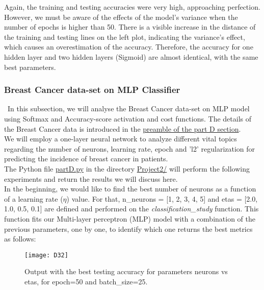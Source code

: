 Again, the training and testing accuracies were very high, approaching perfection. However, we must be aware of the effects of the model's variance when the number of epochs is higher than 50. There is a visible increase in the distance of the training and testing lines on the left plot, indicating the variance's effect, which causes an overestimation of the accuracy. Therefore, the accuracy for one hidden layer and two hidden layers (Sigmoid) are almost identical, with the same best parameters.

\subsubsection{Breast Cancer data-set on MLP Classifier}
\label{chap:Breast Cancer data-set on MLP Classifier}

\quad \, In this subsection, we will analyse the Breast Cancer data-set on MLP model using Softmax and Accuracy-score activation and cost functions. The details of the Breast Cancer data is introduced in the \hyperref[chap:Part D]{preamble of the part D section}.\\

We will employ a one-layer neural network to analyze different vital topics regarding the number of neurons, learning rate, epoch and 'l2' regularization for predicting the incidence of breast cancer in patients.\\

The Python file \href{https://github.com/fabiorodp/UiO-FYS-STK4155/blob/master/Project2/partD.py}{partD.py} in the directory \href{https://github.com/fabiorodp/UiO-FYS-STK4155/blob/master/Project2/}{Project2/} will perform the following experiments and return the results we will discuss here.\\

In the beginning, we would like to find the best number of neurons as a function of a learning rate ($\eta$) value. For that, n\_neurons = [1, 2, 3, 4, 5] and etas = [2.0, 1.0, 0.5, 0.1] are defined and performed on the \textit{classification\_study} function. This function fits our Multi-layer perceptron (MLP) model with a combination of the previous parameters, one by one, to identify which one returns the best metrics as follows:

\begin{figure}[H]
\label{fig:D20}
\centering
\texttt{[image: D32]}
\caption{Output with the best testing accuracy for parameters neurons vs etas, for epoch=50 and batch\_size=25.}
\end{figure}

